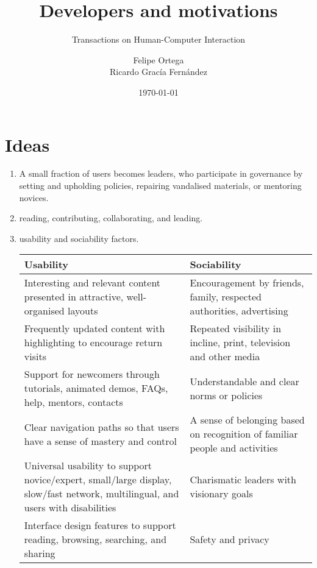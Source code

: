 \documentclass[11pt]{scrartcl}
\title{\textbf{Developers and motivations}}
\subtitle{Transactions on Human-Computer Interaction}
\author{Felipe Ortega\\
		Ricardo Grac\'ia Fern\'andez}
\date{\today}
\begin{document}
\maketitle

\section{Ideas}

	\begin{enumerate}
	
		\item A small fraction of users becomes leaders, who participate in governance by setting and upholding policies, repairing vandalised materials, or mentoring novices.
		\item reading, contributing, collaborating, and leading.
		\item usability and sociability factors.\\
		\begin{tabular}{ | p{6,5cm} | p{} |}
			\hline
			Usability & Sociability \\ \hline
			Interesting and relevant content presented in attractive, well-organised layouts & Encouragement by friends, family, respected authorities, advertising \\ \hline
			Frequently updated content with highlighting to encourage return visits & Repeated visibility in incline, print, television and other media \\ \hline
			Support for newcomers through tutorials, animated demos, FAQs, help, mentors, contacts & Understandable and clear norms or policies \\ \hline
			Clear navigation paths so that users have a sense of mastery and control & A sense of belonging based on recognition of familiar people and activities \\ \hline
			Universal usability to support novice/expert, small/large display, slow/fast network, multilingual, and users with disabilities & Charismatic leaders with visionary goals \\ \hline
			Interface design features to support reading, browsing, searching, and sharing & Safety and privacy \\ \hline
		\end{tabular}
					

\end{enumerate}
\end{document}
